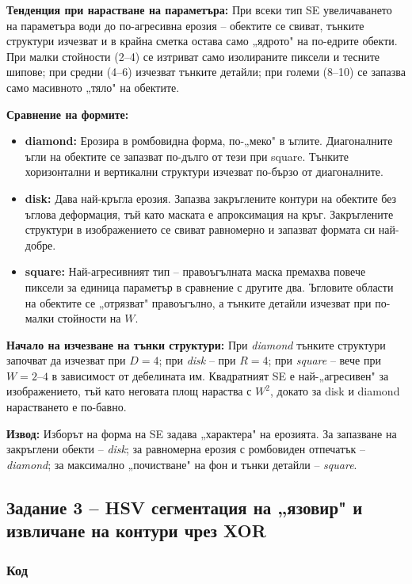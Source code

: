 \textbf{Тенденция при нарастване на параметъра:} При всеки тип SE увеличаването на параметъра води до по-агресивна ерозия – обектите се свиват, тънките структури изчезват и в крайна сметка остава само „ядрото" на по-едрите обекти. При малки стойности (2–4) се изтриват само изолираните пиксели и тесните шипове; при средни (4–6) изчезват тънките детайли; при големи (8–10) се запазва само масивното „тяло" на обектите.

\textbf{Сравнение на формите:}
\begin{itemize}
    \item \textbf{diamond:} Ерозира в ромбовидна форма, по-„меко" в ъглите. Диагоналните ъгли на обектите се запазват по-дълго от тези при square. Тънките хоризонтални и вертикални структури изчезват по-бързо от диагоналните.
    \item \textbf{disk:} Дава най-кръгла ерозия. Запазва закръглените контури на обектите без ъглова деформация, тъй като маската е апроксимация на кръг. Закръглените структури в изображението се свиват равномерно и запазват формата си най-добре.
    \item \textbf{square:} Най-агресивният тип – правоъгълната маска премахва повече пиксели за единица параметър в сравнение с другите два. Ъгловите области на обектите се „отрязват" правоъгълно, а тънките детайли изчезват при по-малки стойности на $W$.
\end{itemize}

\textbf{Начало на изчезване на тънки структури:} При \textit{diamond} тънките структури започват да изчезват при $D=4$; при \textit{disk} – при $R=4$; при \textit{square} – вече при $W=2$–$4$ в зависимост от дебелината им. Квадратният SE е най-„агресивен" за изображението, тъй като неговата площ нараства с $W^2$, докато за disk и diamond нарастването е по-бавно.

\textbf{Извод:} Изборът на форма на SE задава „характера" на ерозията. За запазване на закръглени обекти – \textit{disk}; за равномерна ерозия с ромбовиден отпечатък – \textit{diamond}; за максимално „почистване" на фон и тънки детайли – \textit{square}.

\subsection{Задание 3 – HSV сегментация на „язовир" и извличане на контури чрез XOR}

\subsubsection{Код}

